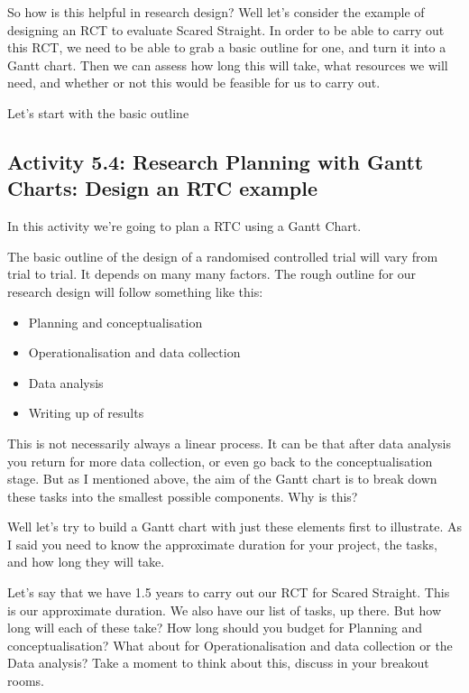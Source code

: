 \documentclass[
]{book}
\providecommand{\tightlist}{%
  \setlength{\itemsep}{0pt}\setlength{\parskip}{0pt}}
\begin{document}
So how is this helpful in research design? Well let's consider the example of designing an RCT to evaluate Scared Straight. In order to be able to carry out this RCT, we need to be able to grab a basic outline for one, and turn it into a Gantt chart. Then we can assess how long this will take, what resources we will need, and whether or not this would be feasible for us to carry out.

Let's start with the basic outline

\hypertarget{activity-5.4-research-planning-with-gantt-charts-design-an-rtc-example}{%
\subsection{Activity 5.4: Research Planning with Gantt Charts: Design an RTC example}\label{activity-5.4-research-planning-with-gantt-charts-design-an-rtc-example}}

In this activity we're going to plan a RTC using a Gantt Chart.

The basic outline of the design of a randomised controlled trial will vary from trial to trial. It depends on many many factors. The rough outline for our research design will follow something like this:

\begin{itemize}
\tightlist
\item
  Planning and conceptualisation
\item
  Operationalisation and data collection
\item
  Data analysis
\item
  Writing up of results
\end{itemize}

This is not necessarily always a linear process. It can be that after data analysis you return for more data collection, or even go back to the conceptualisation stage. But as I mentioned above, the aim of the Gantt chart is to break down these tasks into the smallest possible components. Why is this?

Well let's try to build a Gantt chart with just these elements first to illustrate. As I said you need to know the approximate duration for your project, the tasks, and how long they will take.

Let's say that we have 1.5 years to carry out our RCT for Scared Straight. This is our approximate duration. We also have our list of tasks, up there. But how long will each of these take? How long should you budget for Planning and conceptualisation? What about for Operationalisation and data collection or the Data analysis? Take a moment to think about this, discuss in your breakout rooms.
\end{document}
